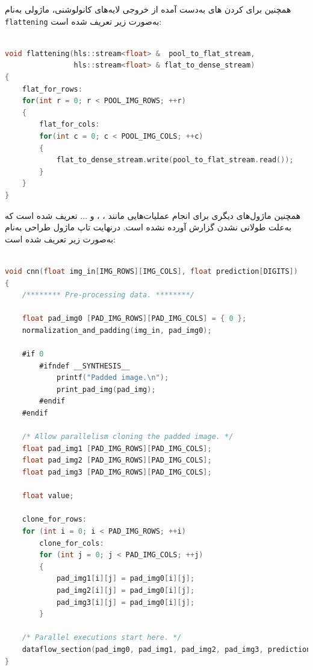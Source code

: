 \begin{qsolve}
	همچنین برای  کردن  های به‌دست آمده از خروجی لایه‌های کانولوشنی، ماژولی به‌نام \texttt{flattening} به‌صورت زیر تعریف شده است:
\end{qsolve}



\begin{latin}
\begin{lstlisting}[language=C,caption={HLS Implementation of Flatten Layers}]
	
void flattening(hls::stream<float> &  pool_to_flat_stream,
 				hls::stream<float> & flat_to_dense_stream)
{
	flat_for_rows:
	for(int r = 0; r < POOL_IMG_ROWS; ++r)
	{
		flat_for_cols:
		for(int c = 0; c < POOL_IMG_COLS; ++c)
		{
			flat_to_dense_stream.write(pool_to_flat_stream.read());
		}
	}
}
\end{lstlisting}
\end{latin}



\begin{qsolve}
	همچنین ماژول‌های دیگری برای انجام عملیات‌هایی مانند ، ،  و ... تعریف شده است که به‌علت طولانی نشدن گزارش آورده نشده است. درنهایت تاپ ماژول طراحی به‌نام  به‌صورت زیر تعریف شده است:

\end{qsolve}



\begin{latin}
\begin{lstlisting}[language=C,caption={HLS Implementation of \texttt{CNN} Top Module}]

void cnn(float img_in[IMG_ROWS][IMG_COLS], float prediction[DIGITS])
{
	/******** Pre-processing data. ********/
	
	float pad_img0 [PAD_IMG_ROWS][PAD_IMG_COLS] = { 0 };
	normalization_and_padding(img_in, pad_img0);
	
	#if 0
		#ifndef __SYNTHESIS__
			printf("Padded image.\n");
			print_pad_img(pad_img);
		#endif
	#endif
	
	/* Allow parallelism cloning the padded image. */
	float pad_img1 [PAD_IMG_ROWS][PAD_IMG_COLS];
	float pad_img2 [PAD_IMG_ROWS][PAD_IMG_COLS];
	float pad_img3 [PAD_IMG_ROWS][PAD_IMG_COLS];
	
	float value;
	
	clone_for_rows:
	for (int i = 0; i < PAD_IMG_ROWS; ++i)
		clone_for_cols:
		for (int j = 0; j < PAD_IMG_COLS; ++j)
		{
			pad_img1[i][j] = pad_img0[i][j];
			pad_img2[i][j] = pad_img0[i][j];
			pad_img3[i][j] = pad_img0[i][j];
		}
	
	/* Parallel executions start here. */
	dataflow_section(pad_img0, pad_img1, pad_img2, pad_img3, prediction);
}

\end{lstlisting}
\end{latin}




